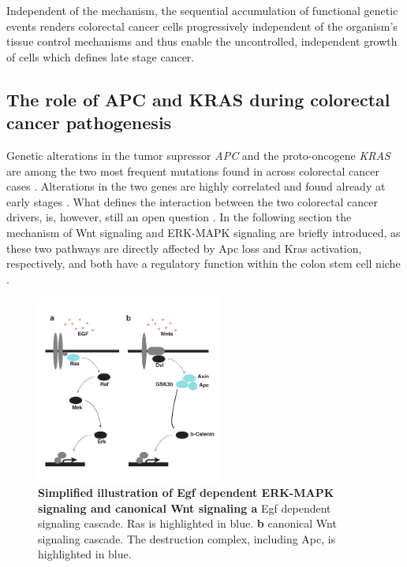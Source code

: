 \begin{flushleft}
Independent of the mechanism, the sequential accumulation of functional genetic events renders colorectal cancer cells progressively independent of the organism's tissue control mechanisms and thus enable the uncontrolled, independent growth of cells which defines late stage cancer.

\subsection{The role of APC and KRAS during colorectal cancer pathogenesis}
Genetic alterations in the tumor supressor \textit{APC} and the proto-oncogene \textit{KRAS} are among the two most frequent mutations found in across colorectal cancer cases \parencite{markowitzMolecularOriginsCancer2009}. Alterations in the two genes are highly correlated and found already at early stages \parencite{minaConditionalSelectionGenomic2017}. What defines the interaction between the two colorectal cancer drivers, is, however, still an open question \parencite{parsonsWNTDriverDependency2021}. In the following section the mechanism of Wnt signaling and ERK-MAPK signaling are briefly introduced, as these two pathways are directly affected by Apc loss and Kras activation, respectively, and both have a regulatory function within the colon stem cell niche \parencite{hTalesCryptNew2019}.

\begin{figure}[h]
\centering
\includegraphics[width=0.55\textwidth,
                keepaspectratio]{figures/adenomaprofiling/pdf/fig_0_1.pdf}
\caption[Simplified illustration of ERK-MAPK signaling and canonical Wnt signaling]{\textbf{Simplified illustration of Egf dependent ERK-MAPK signaling and canonical Wnt signaling a} Egf dependent signaling cascade. Ras is highlighted in blue. \textbf{b} canonical Wnt signaling cascade. The destruction complex, including Apc, is highlighted in blue.}
\label{fig_180}
\end{figure}
\bigbreak


\end{flushleft}
